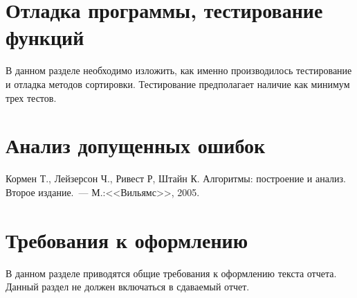 \documentclass[a4paper,12pt,titlepage,final]{article}
\begin{document}
\newpage

\section{Отладка программы, тестирование функций}

В данном разделе необходимо изложить, как именно производилось тестирование
и отладка методов сортировки. Тестирование предполагает наличие как минимум
трех тестов.

\newpage

\section{Анализ допущенных ошибок}

\newpage
\begin{raggedright}
\begin{thebibliography}{99}
 Кормен Т., Лейзерсон Ч., Ривест Р, Штайн К. Алгоритмы: построение и анализ.
    Второе издание.~--- М.:<<Вильямс>>, 2005.
\end{thebibliography}
\end{raggedright}

\newpage

\section*{Требования к оформлению}

В данном разделе приводятся общие требования к оформлению текста отчета.
Данный раздел не должен включаться в сдаваемый отчет.
\end{document}
